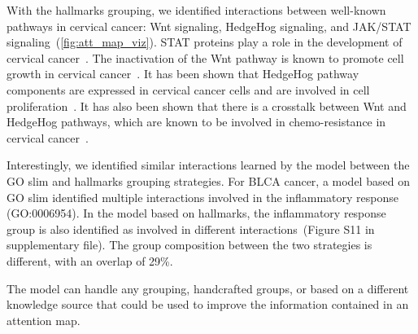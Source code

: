 \documentclass[../main.tex]{subfiles}
\begin{document}
	 With the hallmarks grouping, we identified interactions between well-known pathways in cervical cancer: Wnt signaling, HedgeHog signaling, and JAK/STAT signaling~(\cref{fig:att_map_viz}).
	 STAT proteins play a role in the development of cervical cancer~\cite{gutierrez-hoyaRoleJAKSTAT2020}.
	 The inactivation of the Wnt pathway is known to promote cell growth in cervical cancer~\cite{yangWntSignalingCervical2018}.
	 It has been shown that HedgeHog pathway components are expressed in cervical cancer cells and are involved in cell proliferation~\cite{samarzijaHedgehogPathwayRegulators2012}.
	 It has also been shown that there is a crosstalk between Wnt and HedgeHog pathways, which are known to be involved in chemo-resistance in cervical cancer~\cite{kumarRoleNotchHedgehog2021}.


	 Interestingly, we identified similar interactions learned by the model between the GO slim and hallmarks grouping strategies.
	 For BLCA cancer, a model based on GO slim identified multiple interactions involved in the inflammatory response (GO:0006954).
	 In the model based on hallmarks, the inflammatory response group is also identified as involved in different interactions~(Figure S11 in supplementary file).
	 The group composition between the two strategies is different, with an overlap of 29\%.


	 The model can handle any grouping, handcrafted groups, or based on a different knowledge source that could be used to improve the information contained in an attention map.
\end{document}
